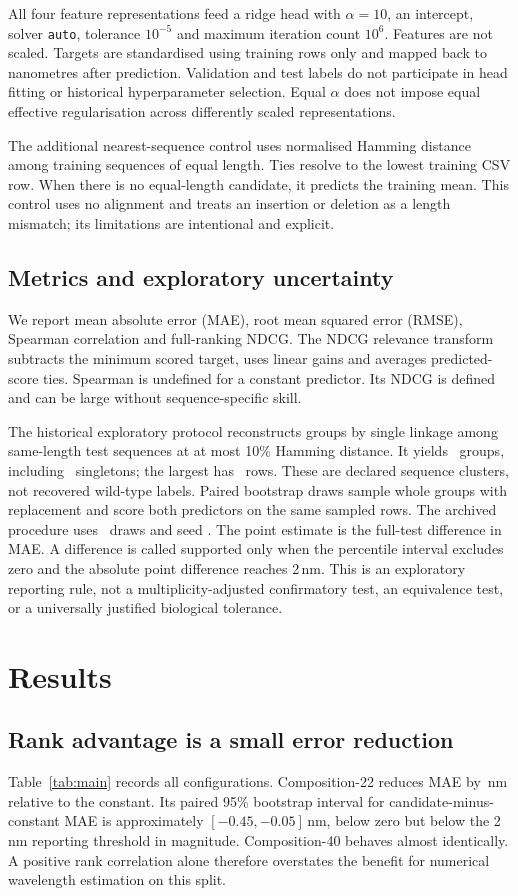 \documentclass[11pt]{article}
\begin{document}
All four feature representations feed a ridge head with $\alpha=10$, an intercept,
solver \texttt{auto}, tolerance $10^{-5}$ and maximum iteration count $10^6$.
Features are not scaled. Targets are standardised using training rows only and mapped
back to nanometres after prediction. Validation and test labels do not participate in
head fitting or historical hyperparameter selection. Equal $\alpha$ does not impose
equal effective regularisation across differently scaled representations.

The additional nearest-sequence control uses normalised Hamming distance among
training sequences of equal length. Ties resolve to the lowest training CSV row.
When there is no equal-length candidate, it predicts the training mean. This control
uses no alignment and treats an insertion or deletion as a length mismatch; its
limitations are intentional and explicit.

\subsection{Metrics and exploratory uncertainty}
We report mean absolute error (MAE), root mean squared error (RMSE), Spearman correlation
and full-ranking NDCG. The NDCG relevance transform subtracts the minimum scored target,
uses linear gains and averages predicted-score ties. Spearman is undefined for a
constant predictor. Its NDCG is defined and can be large without sequence-specific skill.

The historical exploratory protocol reconstructs groups by single linkage among
same-length test sequences at at most 10\% Hamming distance. It yields \Groups\ groups,
including \Singletons\ singletons; the largest has \LargestGroup\ rows. These are declared
sequence clusters, not recovered wild-type labels. Paired bootstrap draws sample whole
groups with replacement and score both predictors on the same sampled rows. The
archived procedure uses \Draws\ draws and seed \BootSeed. The point estimate is the
full-test difference in MAE. A difference is called supported only when the percentile
interval excludes zero and the absolute point difference reaches 2\,nm. This is an
exploratory reporting rule, not a multiplicity-adjusted confirmatory test, an equivalence
test, or a universally justified biological tolerance.

\section{Results}
\subsection{Rank advantage is a small error reduction}
Table~\ref{tab:main} records all configurations. Composition-22 reduces MAE by
\GainMAE\,nm relative to the constant. Its paired 95\% bootstrap interval for
candidate-minus-constant MAE is approximately $[-0.45,-0.05]$\,nm, below zero but below
the 2\,nm reporting threshold in magnitude. Composition-40 behaves almost identically.
A positive rank correlation alone therefore overstates the benefit for numerical
wavelength estimation on this split.
\end{document}
